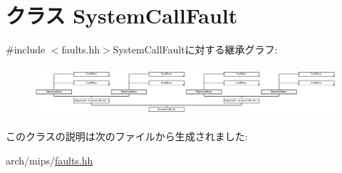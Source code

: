 \hypertarget{classMipsISA_1_1SystemCallFault}{
\section{クラス SystemCallFault}
\label{classMipsISA_1_1SystemCallFault}
}


{\ttfamily \#include $<$faults.hh$>$}SystemCallFaultに対する継承グラフ:\begin{figure}[H]
\begin{center}
\leavevmode
\includegraphics[height=1.85185cm]{classMipsISA_1_1SystemCallFault}
\end{center}
\end{figure}


このクラスの説明は次のファイルから生成されました:\begin{DoxyCompactItemize}
\item 
arch/mips/\hyperlink{arch_2mips_2faults_8hh}{faults.hh}\end{DoxyCompactItemize}
